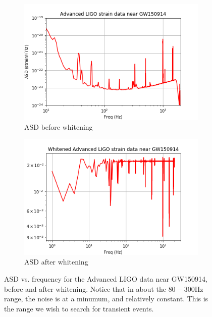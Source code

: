 \documentclass{article}
\begin{document}
\begin{figure}
\begin{subfigure}{\textwidth}
\includegraphics[width=\textwidth]{GW150914_prewhite.png}
\caption{ASD before whitening}
\label{fig:prewhite}
\end{subfigure}

\begin{subfigure}{\textwidth}
\includegraphics[width=\textwidth]{GW150914_white.png}
\caption{ASD after whitening}
\label{fig:postwhite}
\end{subfigure}
\caption{ASD vs. frequency for the Advanced LIGO data near GW150914, before and after whitening. Notice that in about the $80-300\mathrm{Hz}$ range, the noise is at a minumum, and relatively constant. This is the range we wish to search for transient events.}
\label{fig:asd}
\end{figure}
\end{document}
